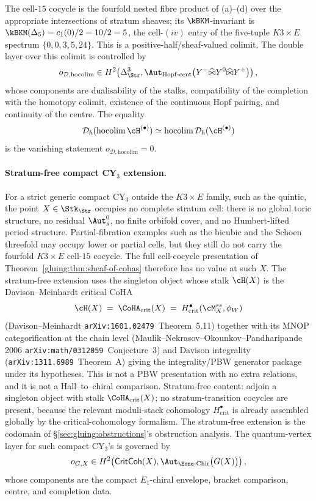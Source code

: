 The cell-$15$ cocycle is the fourfold nested fibre product of (a)--(d)
over the appropriate intersections of stratum sheaves; its
$\kBKM$-invariant is $\kBKM(\Delta_{5})
=c_{1}(0)/2=10/2=5$, the cell-$(iv)$ entry of the five-tuple
$K3\times E$ spectrum $\{0,0,3,5,24\}$.
This is a positive-half/sheaf-valued colimit. The double layer over
this colimit is controlled by
\[
 o_{\mathcal D,\mathrm{hocolim}}\in
 H^2\!\left(
 \Delta^3_{\Str},
 \Aut_{\mathrm{Hopf}\text{-}\mathrm{cent}}
 \bigl(Y^{-}\widehat\bowtie Y^{0}\widehat\bowtie Y^{+}\bigr)
 \right),
\]
whose components are dualisability of the stalks, compatibility of the
completion with the homotopy colimit, existence of the continuous Hopf
pairing, and continuity of the centre. The equality
\[
\mathcal{D}_{\hbar}(\mathrm{hocolim}\,\cH^{(\bullet)})
\simeq
\mathrm{hocolim}\,\mathcal{D}_{\hbar}(\cH^{(\bullet)})
\]
is the vanishing statement \(o_{\mathcal D,\mathrm{hocolim}}=0\).

\paragraph{Stratum-free compact CY$_{3}$ extension.} For a
strict generic compact CY$_{3}$ outside the $K3\times E$ family, such
as the quintic, the point $X\in\Stk_{\Str}$ occupies no complete
stratum cell: there is no global toric structure, no residual
$\Aut_s^0$, no finite orbifold cover, and no Humbert-lifted period
structure. Partial-fibration examples such as the bicubic and the
Schoen threefold may occupy lower or partial cells, but they still do
not carry the fourfold $K3\times E$ cell-$15$ cocycle. The full
cell-cocycle presentation of
Theorem~\ref{gluing:thm:sheaf-of-cohas} therefore has no value at such
\(X\). The stratum-free extension uses the singleton object whose
stalk \(\cH(X)\) is the
Davison--Meinhardt critical CoHA
\[
\cH(X) \;=\; \CoHA_{\mathrm{crit}}(X) \;=\;
H^{\bullet}_{\mathrm{crit}}(\cM^{ss}_{X},\phi_{W})
\]
(Davison--Meinhardt \texttt{arXiv:1601.02479}~Theorem~5.11) together
with its MNOP categorification at the chain level
(Maulik--Nekrasov--Okounkov--Pandharipande 2006
\texttt{arXiv:math/0312059}~Conjecture~3) and Davison integrality
(\texttt{arXiv:1311.6989}~Theorem~A) giving the integrality/PBW
generator package under its hypotheses. This is not a PBW presentation
with no extra relations, and it is not a Hall--to--chiral comparison.
Stratum-free content: adjoin a singleton object with stalk
$\CoHA_{\mathrm{crit}}(X)$; no stratum-transition cocycles are present,
because the relevant moduli-stack cohomology
$H^{\bullet}_{\mathrm{crit}}$ is already assembled globally by the
critical-cohomology formalism. The stratum-free extension is the
codomain of \S\ref{sec:gluing:obstructions}'s obstruction analysis. The
quantum-vertex layer for such compact CY$_3$'s is governed by
\[
 o_{G,X}\in
 H^2\!\left(\mathsf{CritCoh}(X),
 \Aut_{\Eone\text{-}\mathrm{Chir}}\bigl(G(X)\bigr)\right),
\]
whose components are the compact \(E_1\)-chiral envelope, bracket
comparison, centre, and completion data.


